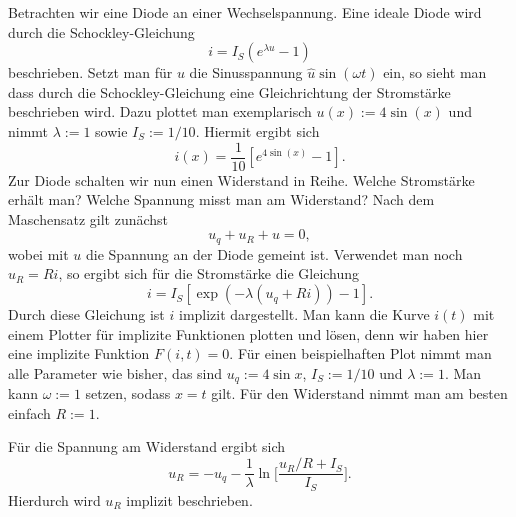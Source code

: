 \documentclass[a4paper,10pt,fleqn,twocolumn,twoside]{article}
\numberwithin{equation}{section}
\begin{document}
\noindent
Betrachten wir eine Diode an einer Wechselspannung. Eine ideale
Diode wird durch die Schockley-Gleichung
\begin{equation}
i=I_S(e^{\lambda u}-1)
\end{equation}
beschrieben. Setzt man für $u$ die Sinusspannung
$\hat u\sin(\omega t)$ ein, so sieht man dass durch die
Schockley-Gleichung eine Gleichrichtung der Stromstärke
beschrieben wird. Dazu plottet man exemplarisch
$u(x):=4\sin(x)$ und nimmt $\lambda:=1$ sowie $I_S:=1/10$.
Hiermit ergibt sich
\begin{equation}
i(x)=\frac{1}{10}[e^{4\sin(x)}-1].
\end{equation}
Zur Diode schalten wir nun einen Widerstand in Reihe.
Welche Stromstärke erhält man? Welche Spannung misst man am
Widerstand? Nach dem Maschensatz gilt zunächst
\begin{equation}
u_q+u_R+u=0,
\end{equation}
wobei mit $u$ die Spannung an der Diode gemeint ist.
Verwendet man noch $u_R=Ri$, so ergibt sich
für die Stromstärke die Gleichung
\begin{equation}\label{eq:impliziti}
i=I_S[\exp(-\lambda(u_q+Ri))-1].
\end{equation}
Durch diese Gleichung ist $i$ implizit dargestellt. Man kann
die Kurve $i(t)$ mit einem Plotter für implizite Funktionen
plotten und lösen, denn wir haben hier eine implizite
Funktion $F(i,t)=0$. Für einen
beispielhaften Plot nimmt man alle Parameter wie bisher, das
sind $u_q:=4\sin x$, $I_S:=1/10$ und
$\lambda:=1$. Man kann $\omega:=1$ setzen, sodass $x=t$ gilt.
Für den Widerstand nimmt man am besten einfach $R:=1$.

Für die Spannung am Widerstand ergibt sich
\begin{equation}\label{eq:DiodeuR}
u_R = -u_q -\frac{1}{\lambda}\ln\Big[\frac{u_R/R+I_S}{I_S}\Big].
\end{equation}
Hierdurch wird $u_R$ implizit beschrieben.
\end{document}
